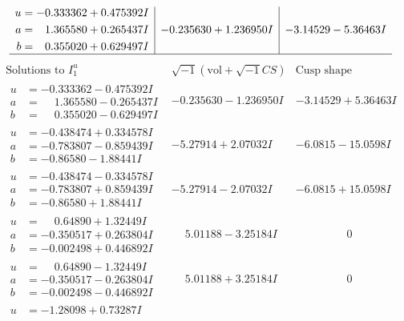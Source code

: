 \documentclass[1p]{elsarticle_modified}
\theoremstyle{definition}
\newcommand{\I}{\sqrt{-1}}
\begin{document}
$$\begin{array}{c|c|c}
\begin{aligned}
u &= -0.333362 + 0.475392 I \\
a &= \phantom{-}1.365580 + 0.265437 I \\
b &= \phantom{-}0.355020 + 0.629497 I\end{aligned}
 & -0.235630 + 1.236950 I & -3.14529 - 5.36463 I\\
 \hline 
 \end{array}$$\newpage$$\begin{array}{c|c|c}  
\text{Solutions to }I^u_{1}& \I (\text{vol} + \sqrt{-1}CS) & \text{Cusp shape}\\
 \hline 
\begin{aligned}
u &= -0.333362 - 0.475392 I \\
a &= \phantom{-}1.365580 - 0.265437 I \\
b &= \phantom{-}0.355020 - 0.629497 I\end{aligned}
 & -0.235630 - 1.236950 I & -3.14529 + 5.36463 I \\ \hline\begin{aligned}
u &= -0.438474 + 0.334578 I \\
a &= -0.783807 - 0.859439 I \\
b &= -0.86580 - 1.88441 I\end{aligned}
 & -5.27914 + 2.07032 I & -6.0815 - 15.0598 I \\ \hline\begin{aligned}
u &= -0.438474 - 0.334578 I \\
a &= -0.783807 + 0.859439 I \\
b &= -0.86580 + 1.88441 I\end{aligned}
 & -5.27914 - 2.07032 I & -6.0815 + 15.0598 I \\ \hline\begin{aligned}
u &= \phantom{-}0.64890 + 1.32449 I \\
a &= -0.350517 + 0.263804 I \\
b &= -0.002498 + 0.446892 I\end{aligned}
 & \phantom{-}5.01188 - 3.25184 I & \phantom{-0.000000 } 0 \\ \hline\begin{aligned}
u &= \phantom{-}0.64890 - 1.32449 I \\
a &= -0.350517 - 0.263804 I \\
b &= -0.002498 - 0.446892 I\end{aligned}
 & \phantom{-}5.01188 + 3.25184 I & \phantom{-0.000000 } 0 \\ \hline\begin{aligned}
u &= -1.28098 + 0.73287 I \\

\end{aligned}
\end{array}$$
\end{document}
